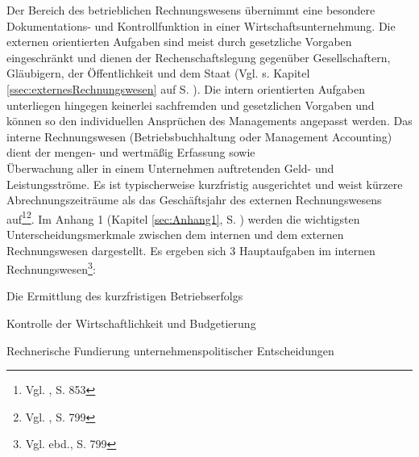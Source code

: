 Der Bereich des betrieblichen Rechnungswesens übernimmt eine besondere Dokumentations- und Kontrollfunktion in einer Wirtschaftsunternehmung.
Die externen orientierten Aufgaben sind meist durch gesetzliche Vorgaben eingeschränkt und dienen der Rechenschaftslegung gegenüber Gesellschaftern, Gläubigern, der Öffentlichkeit und dem Staat (Vgl. s. Kapitel \ref{ssec:externesRechnungswesen} auf S. \pageref{ssec:externesRechnungswesen}).
Die intern orientierten Aufgaben unterliegen hingegen keinerlei sachfremden und gesetzlichen Vorgaben und können so den individuellen Ansprüchen des Managements angepasst werden. Das interne Rechnungswesen (Betriebsbuchhaltung oder Management Accounting) dient der mengen- und wertmäßig Erfassung sowie\\ Überwachung aller in einem Unternehmen auftretenden Geld- und Leistungsströme. Es ist typischerweise kurzfristig ausgerichtet und weist kürzere Abrechnungszeiträume als das Geschäftsjahr des externen Rechnungswesens auf\footnote{Vgl. \cite{Wohe2000}, S. 853}\footnote{Vgl. \cite{Schierenbeck2008}, S. 799}.
Im Anhang 1 (Kapitel \ref{sec:Anhang1}, S. \pageref{tbl2}) werden die wichtigsten Unterscheidungsmerkmale zwischen dem internen und dem externen Rechnungswesen dargestellt.
\noindent Es ergeben sich 3 Hauptaufgaben im internen Rechnungswesen\footnote{Vgl. ebd., S. 799}:
\begin{compactitem}
\item[1] Die Ermittlung des kurzfristigen Betriebserfolgs
\item[2] Kontrolle der Wirtschaftlichkeit und Budgetierung
\item[3] Rechnerische Fundierung unternehmenspolitischer Entscheidungen
\end{compactitem}

